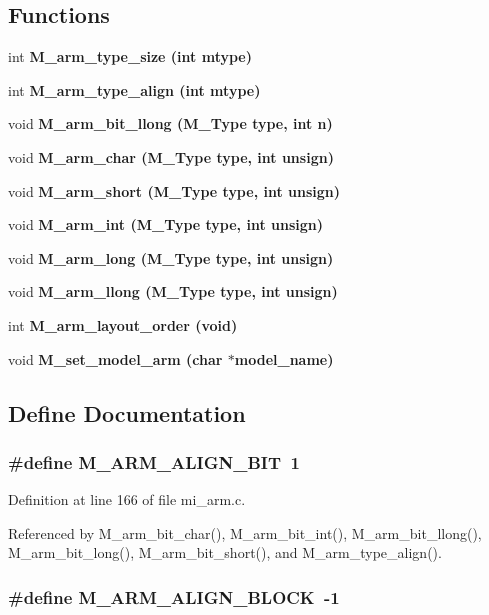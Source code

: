 \subsection*{Functions}
\begin{CompactItemize}
\item 
int \bf{M\_\-arm\_\-type\_\-size} (int mtype)
\item 
int \bf{M\_\-arm\_\-type\_\-align} (int mtype)
\item 
void \bf{M\_\-arm\_\-bit\_\-llong} (\bf{M\_\-Type} type, int n)
\item 
void \bf{M\_\-arm\_\-char} (\bf{M\_\-Type} type, int unsign)
\item 
void \bf{M\_\-arm\_\-short} (\bf{M\_\-Type} type, int unsign)
\item 
void \bf{M\_\-arm\_\-int} (\bf{M\_\-Type} type, int unsign)
\item 
void \bf{M\_\-arm\_\-long} (\bf{M\_\-Type} type, int unsign)
\item 
void \bf{M\_\-arm\_\-llong} (\bf{M\_\-Type} type, int unsign)
\item 
int \bf{M\_\-arm\_\-layout\_\-order} (void)
\item 
void \bf{M\_\-set\_\-model\_\-arm} (char $\ast$model\_\-name)
\end{CompactItemize}


\subsection{Define Documentation}
\subsubsection{\setlength{\rightskip}{0pt plus 5cm}\#define M\_\-ARM\_\-ALIGN\_\-BIT~1}\label{mi__arm_8c_9b3e2ccf45f71615e5b0565812824c32}




Definition at line 166 of file mi\_\-arm.c.

Referenced by M\_\-arm\_\-bit\_\-char(), M\_\-arm\_\-bit\_\-int(), M\_\-arm\_\-bit\_\-llong(), M\_\-arm\_\-bit\_\-long(), M\_\-arm\_\-bit\_\-short(), and M\_\-arm\_\-type\_\-align().
\subsubsection{\setlength{\rightskip}{0pt plus 5cm}\#define M\_\-ARM\_\-ALIGN\_\-BLOCK~-1}\label{mi__arm_8c_eb5884427974e87c1a567da66f146d95}




